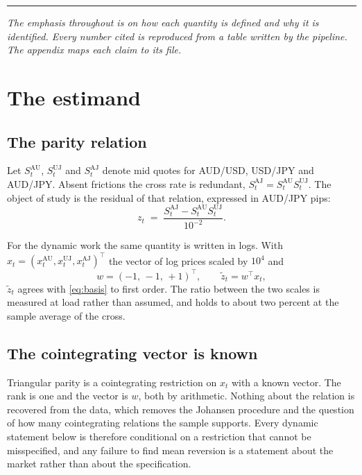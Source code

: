 \documentclass[11pt,a4paper]{article}
\newcommand{\AU}{\mathrm{AU}}
\newcommand{\UJ}{\mathrm{UJ}}
\newcommand{\AJ}{\mathrm{AJ}}
\begin{document}
\vspace{16pt}
\hrule
\vspace{20pt}

\textit{The emphasis throughout is on how each quantity is defined and why it is identified.
Every number cited is reproduced from a table written by the pipeline. The appendix maps
each claim to its file.}

\clearpage

\section{The estimand}

\subsection{The parity relation}

Let $S^{\AU}_t$, $S^{\UJ}_t$ and $S^{\AJ}_t$ denote mid quotes for AUD/USD, USD/JPY and
AUD/JPY. Absent frictions the cross rate is redundant, $S^{\AJ}_t = S^{\AU}_t S^{\UJ}_t$.
The object of study is the residual of that relation, expressed in AUD/JPY pips:
\begin{equation}
z_t \;=\; \frac{S^{\AJ}_t - S^{\AU}_t S^{\UJ}_t}{10^{-2}} .
\label{eq:basis}
\end{equation}

For the dynamic work the same quantity is written in logs. With
$x_t = (x^{\AU}_t, x^{\UJ}_t, x^{\AJ}_t)^{\top}$ the vector of log prices scaled by $10^4$
and
\begin{equation}
w = (-1,\,-1,\,+1)^{\top}, \qquad \tilde z_t = w^{\top} x_t ,
\label{eq:logbasis}
\end{equation}
$\tilde z_t$ agrees with \eqref{eq:basis} to first order. The ratio between the two scales
is measured at load rather than assumed, and holds to about two percent at the sample
average of the cross.

\subsection{The cointegrating vector is known}

Triangular parity is a cointegrating restriction on $x_t$ with a known vector. The rank is
one and the vector is $w$, both by arithmetic. Nothing about the relation is recovered from
the data, which removes the Johansen procedure and the question of how many cointegrating
relations the sample supports. Every dynamic statement below is therefore conditional on a
restriction that cannot be misspecified, and any failure to find mean reversion is a
statement about the market rather than about the specification.
\end{document}
